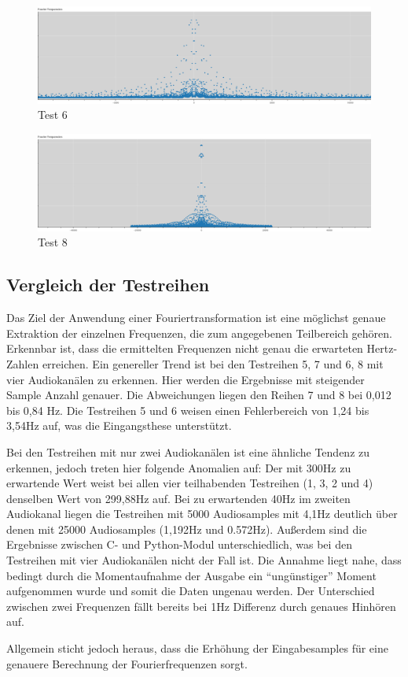 \begin{figure}[h!]
	\centering      
	\includegraphics[scale=0.34]{results/test6.png}
	\caption{Test 6}
	\label{fig:test6}
\end{figure}

\begin{figure}[h!]
	\centering      
	\includegraphics[scale=0.34]{results/test8.png}
	\caption{Test 8}
	\label{fig:test8}
\end{figure}

\newpage

\subsection{Vergleich der Testreihen}

Das Ziel der Anwendung einer Fouriertransformation ist eine möglichst genaue Extraktion der einzelnen Frequenzen, die zum angegebenen Teilbereich gehören.
Erkennbar ist, dass die ermittelten Frequenzen nicht genau die erwarteten Hertz-Zahlen erreichen. Ein genereller Trend ist bei den Testreihen 5, 7 und 6, 8 mit vier Audiokanälen zu erkennen. Hier werden die Ergebnisse mit steigender Sample Anzahl genauer. Die Abweichungen liegen den Reihen 7 und 8 bei 0,012 bis 0,84 Hz. Die Testreihen 5 und 6 weisen einen Fehlerbereich von 1,24 bis 3,54Hz auf, was die Eingangsthese unterstützt.

Bei den Testreihen mit nur zwei Audiokanälen ist eine ähnliche Tendenz zu erkennen, jedoch treten hier folgende Anomalien auf: Der mit 300Hz zu erwartende Wert weist bei allen vier teilhabenden Testreihen (1, 3, 2 und 4) denselben Wert von 299,88Hz auf. Bei zu erwartenden 40Hz im zweiten Audiokanal liegen die Testreihen mit 5000 Audiosamples mit 4,1Hz deutlich über denen mit 25000 Audiosamples (1,192Hz und 0.572Hz). Außerdem sind die Ergebnisse zwischen C- und Python-Modul unterschiedlich, was bei den Testreihen mit vier Audiokanälen nicht der Fall ist. Die Annahme liegt nahe, dass bedingt durch die Momentaufnahme der Ausgabe ein \enquote{ungünstiger} Moment aufgenommen wurde und somit die Daten ungenau werden. Der Unterschied zwischen zwei Frequenzen fällt bereits bei 1Hz Differenz durch genaues Hinhören auf.

Allgemein sticht jedoch heraus, dass die Erhöhung der Eingabesamples für eine genauere Berechnung der Fourierfrequenzen sorgt. 





